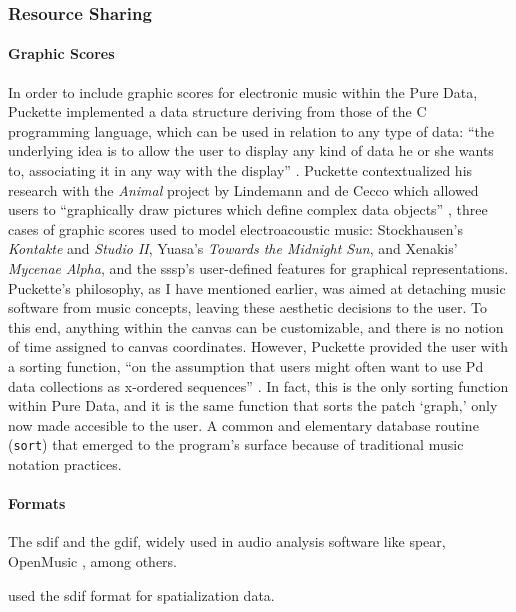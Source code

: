 \subsubsection{Resource Sharing}
{
	\paragraph{Graphic Scores}
	\label{graphic_scores}
	In order to include graphic scores for electronic music within the Pure Data, Puckette implemented a data structure deriving from those of the C programming language, which can be used in relation to any type of data: ``the underlying idea is to allow the user to display any kind of data he or she wants to, associating it in any way with the display'' \parencite[184]{DBLP:conf/icmc/Puckette02}. Puckette contextualized his research with the \textit{Animal} project by Lindemann and de Cecco which allowed users to ``graphically draw pictures which define complex data objects'' \parencite{DBLP:conf/icmc/Lindemann90a}, three cases of graphic scores used to model electroacoustic music: Stockhausen's \textit{Kontakte} and \textit{Studio II}, Yuasa's \textit{Towards the Midnight Sun}, and Xenakis' \textit{Mycenae Alpha}, and the \gls{sssp}'s user-defined features for graphical representations. Puckette's philosophy, as I have mentioned earlier, was aimed at detaching music software from music concepts, leaving these aesthetic decisions to the user. To this end, anything within the canvas can be customizable, and there is no notion of time assigned to canvas coordinates. However, Puckette provided the user with a sorting function, ``on the assumption that users might often want to use Pd data collections as x-ordered sequences'' \parencite[185]{DBLP:conf/icmc/Puckette02}. In fact, this is the only sorting function within Pure Data, and it is the same function that sorts the patch `graph,' only now made accesible to the user. A common and elementary database routine (\texttt{sort}) that emerged to the program's surface because of traditional music notation practices.

	\paragraph{Formats}
	The \gls{sdif} and the \gls{gdif}, widely used in audio analysis software like \gls{spear}, OpenMusic \parencite{icmc/bbp2372.2004.004,kristian_nymoen_2011_849865}, among others. 

	\citeauthor{icmc/bbp2372.2004.004} \parencite{icmc/bbp2372.2004.004} used the \gls{sdif} format for spatialization data. 

}

